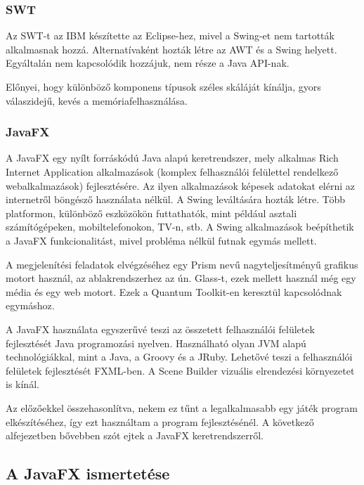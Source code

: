 \subsubsection*{SWT}

Az SWT-t az IBM készítette az Eclipse-hez, mivel a Swing-et nem tartották alkalmasnak hozzá.
Alternatívaként hozták létre az AWT és a Swing helyett.
Egyáltalán nem kapcsolódik hozzájuk, nem része a Java API-nak.\cite{gui}

Előnyei, hogy különböző komponens típusok széles skáláját kínálja, gyors válaszidejű, kevés a memóriafelhasználása.


\subsubsection*{JavaFX}

A JavaFX egy nyílt forráskódú Java alapú keretrendszer, mely alkalmas Rich Internet Application alkalmazások (komplex felhasználói felülettel rendelkező webalkalmazások) fejlesztésére.\cite{javafx, javafx6}
Az ilyen alkalmazások képesek adatokat elérni az internetről böngésző használata nélkül.
A Swing leváltására hozták létre.
Több platformon, különböző eszközökön futtathatók, mint például asztali számítógépeken, mobiltelefonokon, TV-n, stb.
A Swing alkalmazások beépíthetik a JavaFX funkcionalitást, mivel probléma nélkül futnak egymás mellett.

A megjelenítési feladatok elvégzéséhez egy Prism nevű nagyteljesítményű grafikus motort használ, az ablakrendszerhez az ún. Glass-t, ezek mellett használ még egy média és egy web motort.
Ezek a Quantum Toolkit-en keresztül kapcsolódnak egymáshoz.

A JavaFX használata egyszerűvé teszi az összetett felhasználói felületek fejlesztését Java programozási nyelven.
Használható olyan JVM alapú technológiákkal, mint a Java, a Groovy és a JRuby.
Lehetővé teszi a felhasználói felületek fejlesztését FXML-ben.
A Scene Builder vizuális elrendezési környezetet is kínál.

Az előzőekkel összehasonlítva, nekem ez tűnt a legalkalmasabb egy játék program elkészítéséhez, így ezt használtam a program fejlesztésénél.
A következő alfejezetben bővebben szót ejtek a JavaFX keretrendszerről.


\subsection{A JavaFX ismertetése}

